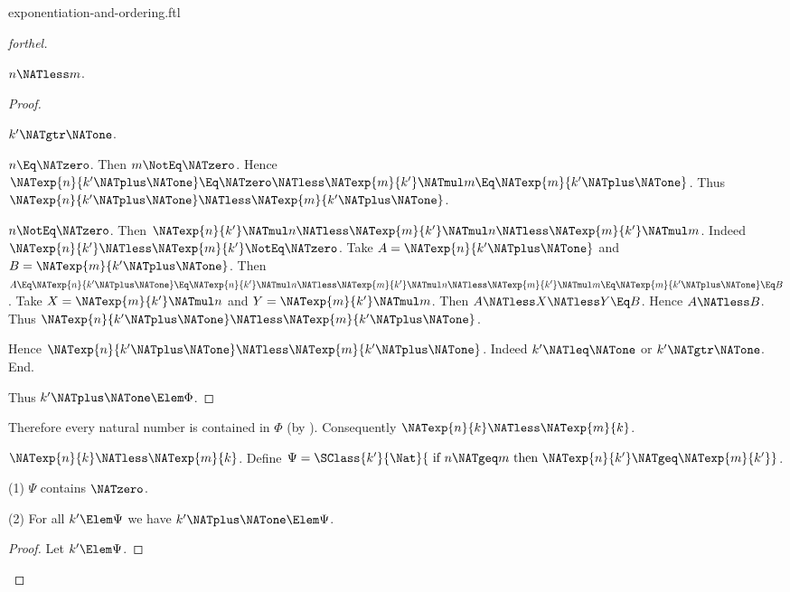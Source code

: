 \documentclass{stex}
\begin{document}
\begin{smodule}{exponentiation-and-ordering.ftl}
\begin{proof}[forthel]
\begin{case}{$n \NATless m$.}
\begin{proof}
        \begin{case}{$k' \NATgtr \NATone$.}
          \begin{case}{$n \Eq \NATzero$.}
            Then $m \NotEq \NATzero$.
            Hence $\NATexp{n}{k' \NATplus \NATone}
              \Eq \NATzero
              \NATless \NATexp{m}{k'} \NATmul m
              \Eq \NATexp{m}{k' \NATplus \NATone}$.
            Thus $\NATexp{n}{k' \NATplus \NATone} \NATless \NATexp{m}{k' \NATplus \NATone}$.
          \end{case}

          \begin{case}{$n \NotEq \NATzero$.}
            Then $\NATexp{n}{k'} \NATmul n
              \NATless \NATexp{m}{k'} \NATmul n
              \NATless \NATexp{m}{k'} \NATmul m$.
            Indeed $\NATexp{n}{k'} \NATless \NATexp{m}{k'} \NotEq \NATzero$.
            Take $A = \NATexp{n}{k' \NATplus \NATone}$ and $B = \NATexp{m}{k' \NATplus \NATone}$. %
            Then $A
              \Eq \NATexp{n}{k' \NATplus \NATone}
              \Eq \NATexp{n}{k'} \NATmul n
              \NATless \NATexp{m}{k'} \NATmul n
              \NATless \NATexp{m}{k'} \NATmul m
              \Eq \NATexp{m}{k' \NATplus \NATone}
              \Eq B$.
            Take $X = \NATexp{m}{k'} \NATmul n$ and $Y = \NATexp{m}{k'} \NATmul m$.
            Then $A \NATless X \NATless Y \Eq B$.
            Hence $A \NATless B$.
            Thus $\NATexp{n}{k' \NATplus \NATone} \NATless \NATexp{m}{k' \NATplus \NATone}$.
          \end{case}
        \end{case}

        Hence $\NATexp{n}{k' \NATplus \NATone} \NATless \NATexp{m}{k' \NATplus \NATone}$.
        Indeed $k' \NATleq \NATone$ or $k' \NATgtr \NATone$.
      End.

      Thus $k' \NATplus \NATone \Elem \Phi$.
    \end{proof}

    Therefore every natural number is contained in $\Phi$ (by ).
    Consequently $\NATexp{n}{k} \NATless \NATexp{m}{k}$.
  \end{case}

  \begin{case}{$\NATexp{n}{k} \NATless \NATexp{m}{k}$.}
    Define $\Psi = \SClass{k'}{\Nat}{\text{ if }n \NATgeq m\text{ then }\NATexp{n}{k'} \NATgeq \NATexp{m}{k'}}$.

    (1) $\Psi$ contains $\NATzero$.

    (2) For all $k' \Elem \Psi$ we have $k' \NATplus \NATone \Elem \Psi$.
    \begin{proof}
      Let $k' \Elem \Psi$.


\end{proof}
\end{case}
\end{proof}
\end{smodule}
\end{document}
